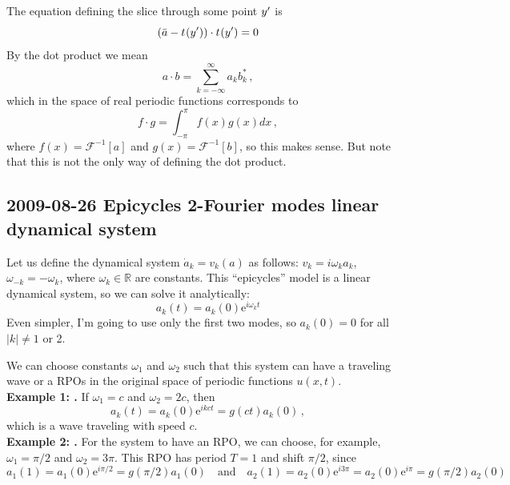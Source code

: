 The equation defining the slice through some point ${y'}$ is
\[ (\bar{a} - t_{}(y')) \cdot t_{}(y') = 0 \]
By the dot product we mean
\[ a \cdot b = \sum_{k=-\infty}^\infty a_k b_k^*\,, \]
which in the space of real periodic functions corresponds to
\[ f \cdot g = \int_{-\pi}^\pi f(x) g(x) dx\,, \]
where $f(x) = \mathcal{F}^{-1}[a]$ and $g(x) = \mathcal{F}^{-1}[b]$,
so this makes sense.  But note that this is not
the only way of defining the dot product.

\subsection{2009-08-26 Epicycles 2-Fourier modes linear dynamical system}
\label{sect:epyc2Fourier}

\medskip{}
Let us define the dynamical system $\dot{a}_k = v_k(a)$ as follows:
$v_k = i \omega_k a_k$, $\omega_{-k} = -\omega_k$,
where $\omega_k \in \mathbb{R}$ are constants.
This
     {``epicycles'' model}
is a linear dynamical system, so we can solve it analytically:
\[ a_k(t) = a_k(0) \mathrm{e}^{i \omega_k t} \]
Even simpler, I'm going to use only the first two modes, so $a_k(0) = 0$ for all $|k| \neq 1$ or 2.

We can choose constants $\omega_1$ and $\omega_2$ such that this system can have
a traveling wave or a RPOs in the original space of periodic functions $u(x,t)$.\\
{\bf Example 1: \Reqv.} If $\omega_1 = c$ and $\omega_2 = 2c$, then
\[ a_k(t) = a_k(0) \mathrm{e}^{ikct} = g(ct) a_k(0)\,, \]
which is a wave traveling with speed $c$.\\
{\bf Example 2: \Rpo.} For the system to have an RPO, we can choose, for example,
$\omega_1 = \pi/2$ and $\omega_2 = 3\pi$.  This RPO has period $T = 1$ and shift $\pi/2$, since
\[ a_1(1) = a_1(0) \mathrm{e}^{i\pi/2} = g(\pi/2) a_1(0) \quad \mathrm{and} \quad
   a_2(1) = a_2(0) \mathrm{e}^{i3\pi} = a_2(0) \mathrm{e}^{i\pi} = g(\pi/2) a_2(0) \]

